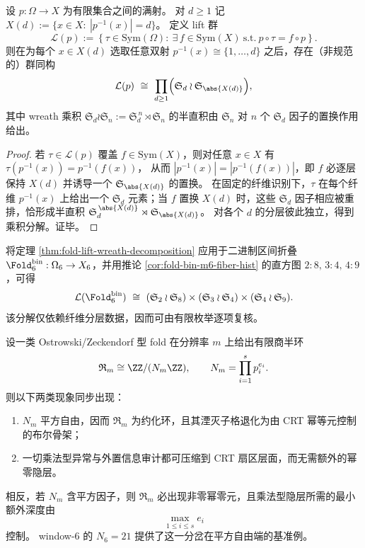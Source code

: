 \begin{theorem}\label{thm:fold-lift-wreath-decomposition}
设 \(p:\Omega\to X\) 为有限集合之间的满射。
对 \(d\ge 1\) 记
\(
X(d):=\{x\in X:\ |p^{-1}(x)|=d\}
\)。
定义 lift 群
\[
\mathcal L(p)
:=\left\{\tau\in\mathrm{Sym}(\Omega):\ \exists\,f\in\mathrm{Sym}(X)\ \text{s.t.}\ p\circ\tau=f\circ p\right\}.
\]
则在为每个 \(x\in X(d)\) 选取任意双射 \(p^{-1}(x)\cong\{1,\dots,d\}\) 之后，存在（非规范的）群同构
\[
\mathcal L(p)\ \cong\ \prod_{d\ge 1}\Bigl(\mathfrak S_d\wr \mathfrak S_{\abs{X(d)}}\Bigr),
\]
其中 wreath 乘积 \(\mathfrak S_d\wr \mathfrak S_n:=\mathfrak S_d^{\,n}\rtimes \mathfrak S_n\) 的半直积由 \(\mathfrak S_n\) 对 \(n\) 个 \(\mathfrak S_d\) 因子的置换作用给出。
\end{theorem}
\begin{proof}
若 \(\tau\in\mathcal L(p)\) 覆盖 \(f\in\mathrm{Sym}(X)\)，则对任意 \(x\in X\) 有
\(
\tau(p^{-1}(x))=p^{-1}(f(x))
\)，
从而 \(|p^{-1}(x)|=|p^{-1}(f(x))|\)，即 \(f\) 必逐层保持 \(X(d)\) 并诱导一个 \(\mathfrak S_{\abs{X(d)}}\) 的置换。
在固定的纤维识别下，\(\tau\) 在每个纤维 \(p^{-1}(x)\) 上给出一个 \(\mathfrak S_d\) 元素；当 \(f\) 置换 \(X(d)\) 时，这些 \(\mathfrak S_d\) 因子相应被重排，恰形成半直积 \(\mathfrak S_d^{\,\abs{X(d)}}\rtimes \mathfrak S_{\abs{X(d)}}\)。
对各个 \(d\) 的分层彼此独立，得到乘积分解。证毕。
\end{proof}

\begin{remark}\label{rem:foldbin6-lift-wreath-normal-form}
将定理 \ref{thm:fold-lift-wreath-decomposition} 应用于二进制区间折叠 \(\Fold^{\mathrm{bin}}_6:\Omega_6\to X_6\)，并用推论 \ref{cor:fold-bin-m6-fiber-hist} 的直方图 \(2:8,\,3:4,\,4:9\)，可得
\[
\mathcal L(\Fold^{\mathrm{bin}}_6)\ \cong\ (\mathfrak S_2\wr \mathfrak S_{8})\times(\mathfrak S_3\wr \mathfrak S_{4})\times(\mathfrak S_4\wr \mathfrak S_{9}).
\]
该分解仅依赖纤维分层数据，因而可由有限枚举逐项复核。
\end{remark}

\begin{conjecture}[平方自由压缩边界与乘法隐层深度]\label{conj:fold-prime-sector-omega-bound}
设一类 Ostrowski/Zeckendorf 型 fold 在分辨率 \(m\) 上给出有限商半环
\[
\mathfrak R_m\cong \ZZ/(N_m\ZZ),
\qquad
N_m=\prod_{i=1}^{s} p_i^{e_i}.
\]
则以下两类现象同步出现：
\begin{enumerate}
  \item \(N_m\) 平方自由，因而 \(\mathfrak R_m\) 为约化环，且其湮灭子格退化为由 CRT 幂等元控制的布尔骨架；
  \item 一切乘法型异常与外置信息审计都可压缩到 CRT 扇区层面，而无需额外的幂零隐层。
\end{enumerate}
相反，若 \(N_m\) 含平方因子，则 \(\mathfrak R_m\) 必出现非零幂零元，且乘法型隐层所需的最小额外深度由
\[
\max_{1\le i\le s} e_i
\]
控制。
window-\(6\) 的 \(N_6=21\) 提供了这一分岔在平方自由端的基准例。
\end{conjecture}

\endinput
